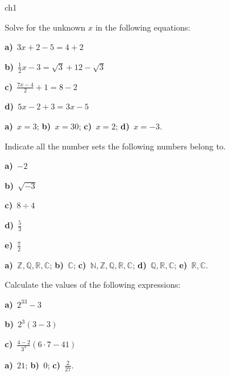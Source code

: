 
\begin{exercises}{ch1}	


	\begin{exercise}
		Solve for the unknown $x$ in the following equations:

		\twocol
		\textbf{a)}~$3x+2-5=4+2$

		\textbf{b)}~$\frac{1}{2}x-3=\sqrt{3}+12-\sqrt{3}$
		\endtwocol

		\twocol
		\textbf{c)}~$\frac{7x-4}{2} +1 = 8-2$
		
		\textbf{d)}~$5x-2+3=3x-5$
		\endtwocol
				
		\begin{eanswer}\textbf{a)}~$x=3$; \textbf{b)}~$x=30$; \textbf{c)}~$x=2$; \textbf{d)}~$x=-3$.\end{eanswer}
					\end{exercise}


	\begin{exercise}
		Indicate all the number sets the following numbers belong to.
				
		\fivecol
		\textbf{a)}~$-2$ 

		\textbf{b)}~$\sqrt{-3}$
		
		\textbf{c)}~$8 \div 4$
		
		\textbf{d)}~$\frac{5}{3}$
		
		\textbf{e)}~$\frac{\pi}{2}$
		
		\endfivecol
		
		\begin{eanswer}\textbf{a)}~$\mathbb{Z}, \mathbb{Q}, \mathbb{R},\mathbb{C}$;
					\textbf{b)}~$\mathbb{C}$;
					\textbf{c)}~$\mathbb{N},\mathbb{Z}, \mathbb{Q}, \mathbb{R},\mathbb{C}$;
					\textbf{d)}~$\mathbb{Q}, \mathbb{R},\mathbb{C}$;
					\textbf{e)}~$\mathbb{R},\mathbb{C}$.\end{eanswer}
					\end{exercise}

	

	\begin{exercise}
		Calculate the values of the following expressions:
		
		\threecol
		\textbf{a)}~$2^33-3$ 

		\textbf{b)}~$2^3(3-3)$
		
		\textbf{c)}~$\frac{4-2}{3^3}(6\cdot 7- 41)$
		\endthreecol
		
		\begin{eanswer}\textbf{a)}~$21$; \textbf{b)}~$0$; \textbf{c)}~$\frac{2}{27}$.\end{eanswer}
					\end{exercise}	



\end{exercises}
